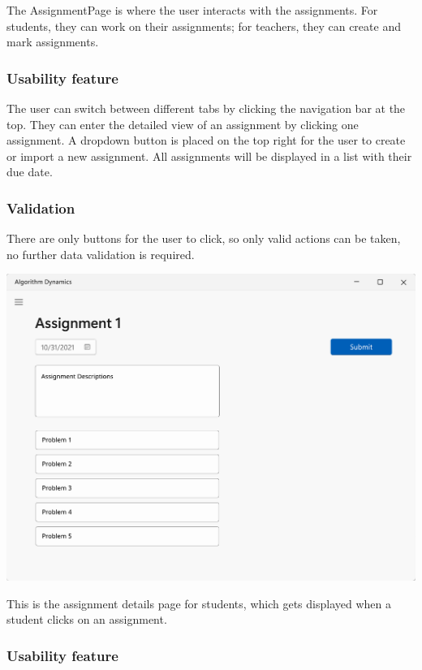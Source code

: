 \documentclass[a4paper]{report}
\begin{document}
The AssignmentPage is where the user interacts with the assignments. For students, they can work on their assignments; for teachers, they can create and mark assignments.

\subsubsection{Usability feature}

The user can switch between different tabs by clicking the navigation bar at the top. They can enter the detailed view of an assignment by clicking one assignment. A dropdown button is placed on the top right for the user to create or import a new assignment. All assignments will be displayed in a list with their due date.

\subsubsection{Validation}

There are only buttons for the user to click, so only valid actions can be taken, no further data validation is required.

\includegraphics[width=\textwidth, height=\textheight, keepaspectratio]{AssignmentsStudentDetailsPage-design}

This is the assignment details page for students, which gets displayed when a student clicks on an assignment.

\subsubsection{Usability feature}
\end{document}
